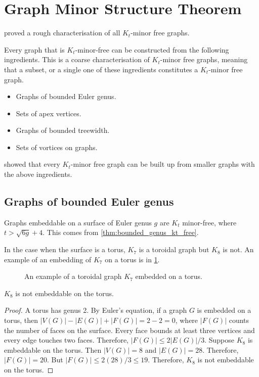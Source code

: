 \section{Graph Minor Structure Theorem}\label{sec:Kt_Minor_Free}
\textcite{robertsonGraphMinorsXVII1999} proved a rough characterisation of all \(K_t\)-minor free graphs. 

Every graph that is $K_t$-minor-free can be constructed from the following ingredients. This is a coarse characterisation of $K_t$-minor free graphs, meaning that a subset, or a single one of these ingredients constitutes a $K_t$-minor free graph. 
\begin{itemize}
	\item Graphs of bounded Euler genus.
	\item Sets of apex vertices.
	\item Graphs of bounded treewidth.
	\item Sets of vortices on graphs.
\end{itemize}
\textcite{robertsonGraphMinorsXVII1999} showed that every \(K_t\)-minor free graph can be built up from smaller graphs with the above ingredients.

\subsection{Graphs of bounded Euler genus}

Graphs embeddable on a surface of Euler genus $g$ are $K_t$ minor-free, where \(t > \sqrt{6g} + 4\). This comes from \cref{thm:bounded_genus_kt_free}. 

In the case when the surface is a torus, $K_7$ is a toroidal graph but $K_8$ is not. An example of an embedding of $K_7$ on a torus is in \cref{fig:k7_on_torus}.

\begin{figure}[h!]
	\centering
	
	\caption[Toroidal graph]{An example of a toroidal graph $K_7$ embedded on a torus.}\label{fig:k7_on_torus}
\end{figure}

\begin{proposition}
	$K_8$ is not embeddable on the torus.
\end{proposition}
\begin{proof}
	A torus has genus 2. By Euler's equation, if a graph $G$ is embedded on a torus, then $|V(G)| - |E(G)| + |F(G)| = 2 - 2 = 0$, where $|F(G)|$ counts the number of faces on the surface. Every face bounds at least three vertices and every edge touches two faces. Therefore, $|F(G)| \leq 2|E(G)|/3$. Suppose $K_8$ is embeddable on the torus. Then $|V(G)| = 8$ and $|E(G)| = 28$. Therefore, $|F(G)| = 20$. But $|F(G)| \leq 2 (28)/3 \leq 19$. Therefore, $K_8$ is not embeddable on the torus.
\end{proof}


